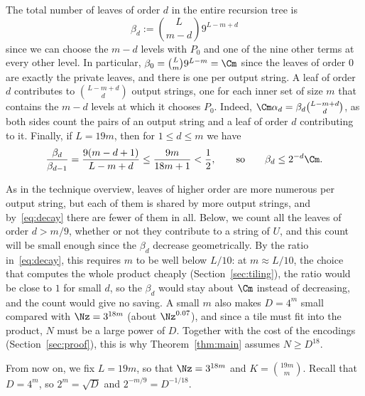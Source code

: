 The total number of leaves of order $d$ in the entire recursion tree is
\[
\beta_d:=\binom{L}{m-d}9^{L-m+d}
\]
since we can choose the $m-d$ levels with $P_0$ and one of the nine other terms at every other level. In particular, $\beta_0=\binom Lm9^{L-m}=\Cm$ since the leaves of order $0$ are exactly the private leaves, and there is one per output string. A leaf of order $d$ contributes to $\binom{L-m+d}{d}$ output strings, one for each inner set of size $m$ that contains the $m-d$ levels at which it chooses $P_0$. Indeed, $\Cm\alpha_d=\beta_d\binom{L-m+d}{d}$, as both sides count the pairs of an output string and a leaf of order $d$ contributing to it. Finally, if $L=19m$, then for $1\le d\le m$ we have
\begin{equation}\label{eq:decay}
\frac{\beta_d}{\beta_{d-1}}=\frac{9(m-d+1)}{L-m+d}\le\frac{9m}{18m+1}<\frac12,\qquad\text{so}\qquad \beta_d\le2^{-d}\Cm .
\end{equation}

As in the technique overview, leaves of higher order are more numerous per output string, but each of them is shared by more output strings, and by~\eqref{eq:decay} there are fewer of them in all. Below, we count all the leaves of order $d>m/9$, whether or not they contribute to a string of $U$, and this count will be small enough since the $\beta_d$ decrease geometrically. By the ratio in~\eqref{eq:decay}, this requires $m$ to be well below $L/10$: at $m\approx L/10$, the choice that computes the whole product cheaply (Section~\ref{sec:tiling}), the ratio would be close to $1$ for small $d$, so the $\beta_d$ would stay about $\Cm$ instead of decreasing, and the count would give no saving. A small $m$ also makes $D=4^m$ small compared with $\Nz=3^{18m}$ (about $\Nz^{0.07}$), and since a tile must fit into the product, $N$ must be a large power of $D$. Together with the cost of the encodings (Section~\ref{sec:proof}), this is why Theorem~\ref{thm:main} assumes $N\ge D^{18}$.

From now on, we fix $L=19m$, so that $\Nz=3^{18m}$ and $K=\binom{19m}m$. Recall that $D=4^m$, so $2^m=\sqrt D$ and $2^{-m/9}=D^{-1/18}$.

